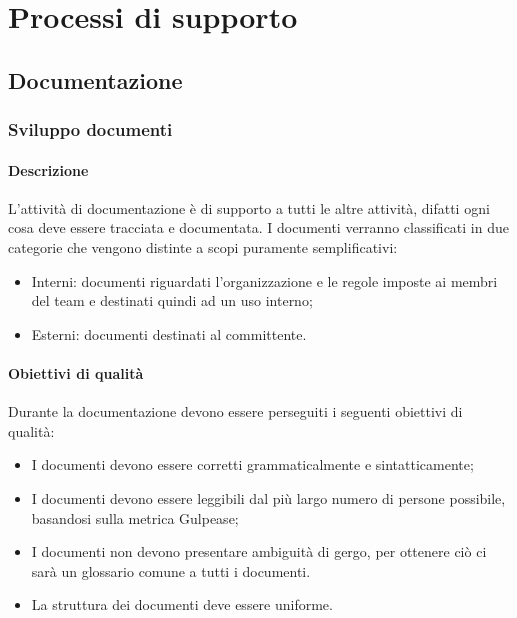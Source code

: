 \documentclass[../NormeDiProgetto_v4.0.0.tex]{subfiles}
\begin{document}
\section{Processi di supporto}
	\subsection{Documentazione}
		\subsubsection{Sviluppo documenti}
			\paragraph{Descrizione}
				L'attività di documentazione è di supporto a tutti le altre attività, difatti ogni cosa deve essere tracciata e documentata.
				I documenti verranno classificati in due categorie che vengono distinte a scopi puramente semplificativi:
				\begin{itemize}
					\item Interni: documenti riguardati l'organizzazione e le regole imposte ai membri del team e destinati quindi ad un uso interno;
					\item Esterni: documenti destinati al committente.
				\end{itemize}

			\paragraph{Obiettivi di qualità}
				Durante la documentazione devono essere perseguiti i seguenti obiettivi di qualità:
				\begin{itemize}
					\item I documenti devono essere corretti grammaticalmente e sintatticamente;
					\item I documenti devono essere leggibili dal più largo numero di persone possibile, basandosi sulla metrica Gulpease;
					\item I documenti non devono presentare ambiguità di gergo, per ottenere ciò ci sarà un glossario comune a tutti i documenti.
					\item La struttura dei documenti deve essere uniforme.
				\end{itemize}
\end{document}
